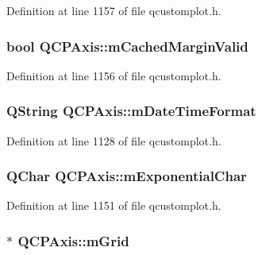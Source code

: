 Definition at line 1157 of file qcustomplot.\-h.

\hypertarget{class_q_c_p_axis_a2cde37b6e385f47e11322df4ac1b0e9b}{
\subsubsection[{m\-Cached\-Margin\-Valid}]{\setlength{\rightskip}{0pt plus 5cm}bool Q\-C\-P\-Axis\-::m\-Cached\-Margin\-Valid\hspace{0.3cm}{\ttfamily [protected]}}}\label{class_q_c_p_axis_a2cde37b6e385f47e11322df4ac1b0e9b}


Definition at line 1156 of file qcustomplot.\-h.

\hypertarget{class_q_c_p_axis_a0b7ad83550d71daab4cfee2918e168e0}{
\subsubsection[{m\-Date\-Time\-Format}]{\setlength{\rightskip}{0pt plus 5cm}Q\-String Q\-C\-P\-Axis\-::m\-Date\-Time\-Format\hspace{0.3cm}{\ttfamily [protected]}}}\label{class_q_c_p_axis_a0b7ad83550d71daab4cfee2918e168e0}


Definition at line 1128 of file qcustomplot.\-h.

\hypertarget{class_q_c_p_axis_a0ec9dbb79704be01f780d34c6f57a08e}{
\subsubsection[{m\-Exponential\-Char}]{\setlength{\rightskip}{0pt plus 5cm}Q\-Char Q\-C\-P\-Axis\-::m\-Exponential\-Char\hspace{0.3cm}{\ttfamily [protected]}}}\label{class_q_c_p_axis_a0ec9dbb79704be01f780d34c6f57a08e}


Definition at line 1151 of file qcustomplot.\-h.

\hypertarget{class_q_c_p_axis_a17bffb94aaa40311f259c6ac7bcb5d5f}{
\subsubsection[{m\-Grid}]{$\ast$ Q\-C\-P\-Axis\-::m\-Grid\hspace{0.3cm}{\ttfamily [protected]}}}\label{class_q_c_p_axis_a17bffb94aaa40311f259c6ac7bcb5d5f}


